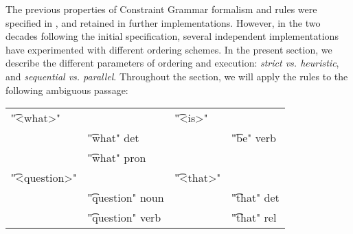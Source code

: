 {The previous properties of Constraint Grammar formalism and rules were specified in \cite{karlsson1995constraint}, and retained in further implementations. 
However, in the two decades following the initial specification, 
several independent implementations have experimented with different ordering
schemes. In the present section, we describe the different parameters of ordering and execution: \emph{strict vs. heuristic}, and \emph{sequential vs. parallel}.
%
%
%
Throughout the section, we will apply the rules to the following ambiguous passage:

\begin{tabular}{p{0.6cm} l  p{0.6cm} l}
\t{"<what>"}     &                      &  \t{"<is>"}           & \\
                 & \t{"what" det}       & &      \t{"be" verb}    \\
                 & \t{"what" pron}      &                       & \\
\t{"<question>"} &                      & \t{"<that>"}         & \\
                 & \t{"question" noun}  & &      \t{"that" det}   \\
                 & \t{"question" verb}  & &      \t{"that" rel}
\end{tabular}

}
